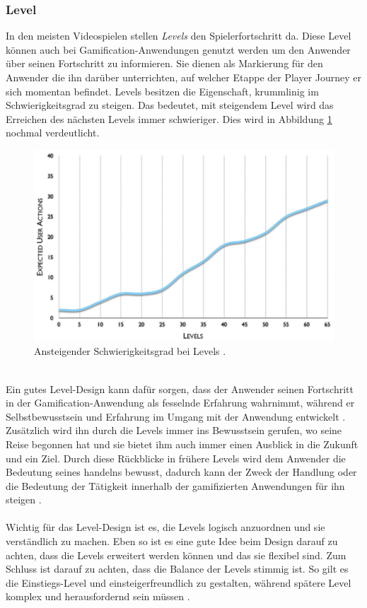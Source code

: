 \documentclass[a4paper,12pt,twoside]{scrartcl}
\begin{document}
\subsubsection{Level}
In den meisten Videospielen stellen \textit{Levels} den Spielerfortschritt da. Diese Level können auch bei Gamification-Anwendungen genutzt werden um den Anwender über seinen Fortschritt zu informieren. Sie dienen als Markierung für den Anwender die ihn darüber unterrichten, auf welcher Etappe der Player Journey er sich momentan befindet. Levels besitzen die Eigenschaft, krummlinig im Schwierigkeitsgrad zu steigen. Das bedeutet, mit steigendem Level wird das Erreichen des nächsten Levels immer schwieriger. Dies wird in Abbildung \ref{LevelkomplexitätBild} nochmal verdeutlicht.
\\
\begin{figure}[h!]
\begin{center}
\includegraphics[scale = 0.7]{Bilder/Levels.eps}
\caption{Ansteigender Schwierigkeitsgrad bei Levels \cite{Zichermann2011}.}
\label{LevelkomplexitätBild}
\end{center}
\end{figure} 
\\
Ein gutes Level-Design kann dafür sorgen, dass der Anwender seinen Fortschritt in der Gamification-Anwendung als fesselnde Erfahrung wahrnimmt, während er Selbstbewusstsein und Erfahrung im Umgang mit der Anwendung entwickelt \cite{Zichermann2011}. Zusätzlich wird ihn durch die Levels immer ins Bewusstsein gerufen, wo seine Reise begonnen hat und sie bietet ihm auch immer einen Ausblick in die Zukunft und ein Ziel. Durch diese Rückblicke in frühere Levels wird dem Anwender die Bedeutung seines handelns bewusst, dadurch kann der Zweck der Handlung oder die Bedeutung der Tätigkeit innerhalb der gamifizierten Anwendungen für ihn steigen \cite{Zichermann2011}.
\\\\
Wichtig für das Level-Design ist es, die Levels logisch anzuordnen und sie verständlich zu machen. Eben so ist es eine gute Idee beim Design darauf zu achten, dass die Levels erweitert werden können und das sie flexibel sind. Zum Schluss ist darauf zu achten, dass die Balance der Levels stimmig ist. So gilt es die Einstiegs-Level und einsteigerfreundlich zu gestalten, während spätere Level komplex und herausfordernd sein müssen \cite{Zichermann2011}.
\end{document}
